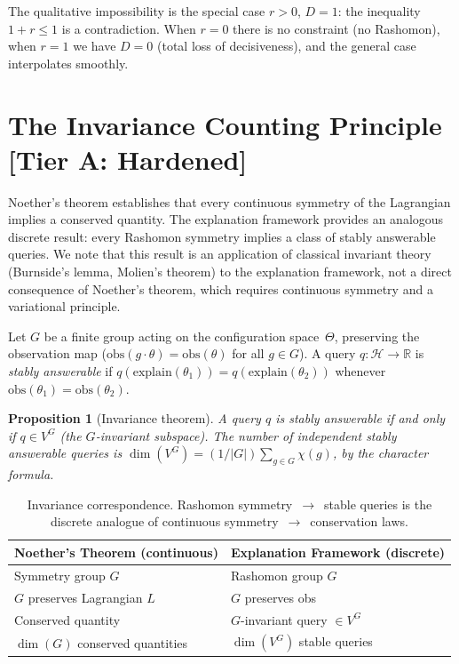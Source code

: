 \documentclass[11pt,a4paper]{article}
\newtheorem{proposition}[theorem]{Proposition}
\newcommand{\R}{\mathbb{R}}
\begin{document}
The qualitative impossibility is the special case $r > 0$, $D = 1$: the
inequality $1 + r \leq 1$ is a contradiction.  When $r = 0$ there is no
constraint (no Rashomon), when $r = 1$ we have $D = 0$ (total loss of
decisiveness), and the general case interpolates smoothly.

\section{The Invariance Counting Principle\,\textnormal{\normalsize[Tier A: Hardened]}}
\label{sec:bridge-noether}

Noether's theorem \citep{noether1918invariante} establishes that every
continuous symmetry of the Lagrangian implies a conserved quantity.  The
explanation framework provides an analogous discrete result: every Rashomon
symmetry implies a class of stably answerable queries.  We note that this
result is an application of classical invariant theory (Burnside's lemma,
Molien's theorem) to the explanation framework, not a direct consequence of
Noether's theorem, which requires continuous symmetry and a variational
principle.

Let $G$ be a finite group acting on the configuration space~$\Theta$,
preserving the observation map ($\mathrm{obs}(g \cdot \theta) =
\mathrm{obs}(\theta)$ for all $g \in G$).  A query
$q\colon \mathcal{H} \to \R$ is \emph{stably answerable} if
$q(\mathrm{explain}(\theta_1)) = q(\mathrm{explain}(\theta_2))$ whenever
$\mathrm{obs}(\theta_1) = \mathrm{obs}(\theta_2)$.

\begin{proposition}[Invariance theorem]
\label{prop:noether}
A query $q$ is stably answerable if and only if $q \in V^G$ (the
$G$-invariant subspace).  The number of independent stably answerable queries
is $\dim(V^G) = (1/|G|) \sum_{g \in G} \chi(g)$, by the character formula.
\end{proposition}

\begin{table}[t]
  \centering
  \small
  \begin{tabular}{@{}ll@{}}
    \toprule
    \textbf{Noether's Theorem (continuous)} & \textbf{Explanation Framework (discrete)} \\
    \midrule
    Symmetry group $G$ & Rashomon group $G$ \\
    $G$ preserves Lagrangian $L$ & $G$ preserves obs \\
    Conserved quantity & $G$-invariant query $\in V^G$ \\
    $\dim(G)$ conserved quantities & $\dim(V^G)$ stable queries \\
    \bottomrule
  \end{tabular}
  \caption{Invariance correspondence.  Rashomon symmetry~$\to$~stable queries
    is the discrete analogue of continuous symmetry~$\to$~conservation laws.}
  \label{tab:noether-dictionary}
\end{table}
\end{document}
